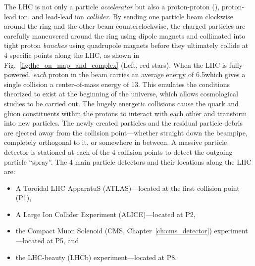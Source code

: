 The LHC is not only a particle \emph{accelerator} but also a proton-proton (\pp), proton-lead ion, and lead-lead ion \emph{collider}.
By sending one particle beam clockwise around the ring and the other beam counterclockwise, the charged particles are carefully maneuvered around the ring using dipole magnets and collimated into tight proton \emph{bunches} using quadrupole magnets before they ultimately collide at 4 specific points along the LHC, as shown in Fig.~\ref{fig:lhc_on_map_and_complex} (Left, red stars).
When the LHC is fully powered, \emph{each} proton in the beam carries an average energy of 6.5\TeV which gives a single \pp collision a center-of-mass energy of 13\TeV.
This emulates the conditions theorized to exist at the beginning of the universe, which allows cosmological studies to be carried out.
The hugely energetic \pp collisions cause the quark and gluon constituents within the protons to interact with each other and transform into new particles.
The newly created particles and the residual particle debris are ejected away from the collision point---whether straight down the beampipe, completely orthogonal to it, or somewhere in between.
A massive particle detector is stationed at each of the 4 collision points to detect the outgoing particle ``spray''.
The 4 main particle detectors and their locations along the LHC are:
\begin{itemize}
    \item A Toroidal LHC ApparatuS (ATLAS)---located at the first collision point (P1),
    \item A Large Ion Collider Experiment (ALICE)---located at P2,
    \item the Compact Muon Solenoid (CMS, Chapter~\ref{ch:cms_detector}) experiment---located at P5, and
    \item the LHC-beauty (LHCb) experiment---located at P8.
\end{itemize}

